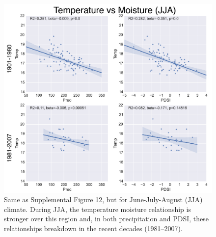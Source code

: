 \documentclass[12pt]{article}
\begin{document}
\begin{figure}
\center
\includegraphics[width=1.0\columnwidth,scale=2]{SUPP_fig_14_temp_vs_moist_JJA.png}
\caption{Same as Supplemental Figure 12, but for June-July-August (JJA) climate. During JJA, the temperature moisture relationship is stronger over this region and, in both precipitation and PDSI, these relationships breakdown in the recent decades (1981--2007).}
\end{figure}
\end{document}
